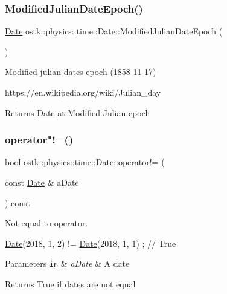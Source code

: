 \subsubsection{\texorpdfstring{Modified\+Julian\+Date\+Epoch()}{ModifiedJulianDateEpoch()}}
{\footnotesize\ttfamily \hyperlink{classostk_1_1physics_1_1time_1_1_date}{Date} ostk\+::physics\+::time\+::\+Date\+::\+Modified\+Julian\+Date\+Epoch (\begin{DoxyParamCaption}{ }\end{DoxyParamCaption})\hspace{0.3cm}{\ttfamily [static]}}



Modified julian dates epoch (1858-\/11-\/17) 

https\+://en.wikipedia.\+org/wiki/\+Julian\+\_\+day

\begin{DoxyReturn}{Returns}
\hyperlink{classostk_1_1physics_1_1time_1_1_date}{Date} at Modified Julian epoch 
\end{DoxyReturn}
\mbox{\label{classostk_1_1physics_1_1time_1_1_date_a556e99ee4d580ef765e67e150193872e}} 
\subsubsection{\texorpdfstring{operator"!=()}{operator!=()}}
{\footnotesize\ttfamily bool ostk\+::physics\+::time\+::\+Date\+::operator!= (\begin{DoxyParamCaption}\item[{const \hyperlink{classostk_1_1physics_1_1time_1_1_date}{Date} \&}]{a\+Date }\end{DoxyParamCaption}) const}



Not equal to operator. 


\begin{DoxyCode}
\hyperlink{classostk_1_1physics_1_1time_1_1_date_a3ff43a5f7a8ce8350e894b51befeb50d}{Date}(2018, 1, 2) != \hyperlink{classostk_1_1physics_1_1time_1_1_date_a3ff43a5f7a8ce8350e894b51befeb50d}{Date}(2018, 1, 1) ; \textcolor{comment}{// True}
\end{DoxyCode}



\begin{DoxyParams}[1]{Parameters}
\mbox{\tt in}  & {\em a\+Date} & A date \\
\hline
\end{DoxyParams}
\begin{DoxyReturn}{Returns}
True if dates are not equal 
\end{DoxyReturn}
\mbox{\label{classostk_1_1physics_1_1time_1_1_date_aeb81c9a588fb376cff125b5c7a6c102b}} 
